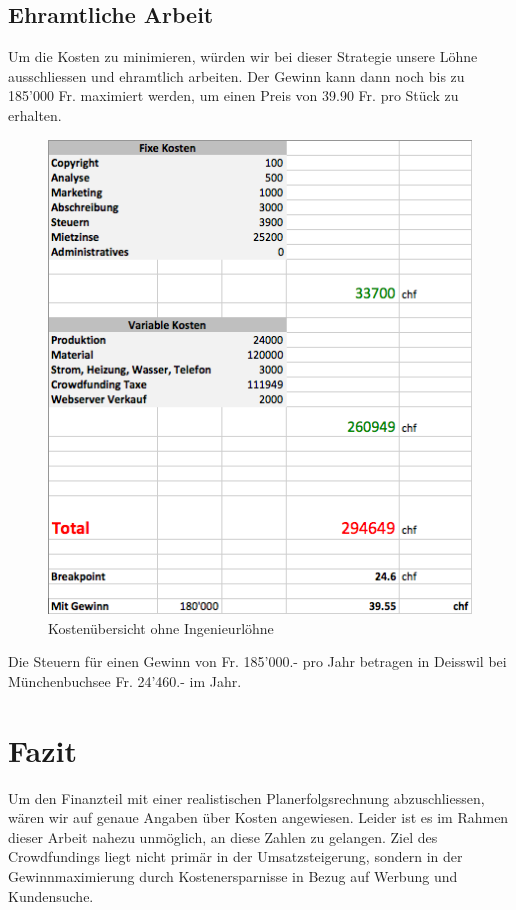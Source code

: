 \subsection{Ehramtliche Arbeit}
Um die Kosten zu minimieren, w\"urden wir bei dieser Strategie unsere L\"ohne ausschliessen und ehramtlich arbeiten.
Der Gewinn kann dann noch bis zu 185'000 Fr. maximiert werden, um einen Preis von 39.90 Fr. pro St\"uck zu erhalten.
\begin{figure}[H]
	\centering
		\includegraphics[scale=0.6]{bilder/ehramtlich.png}
	\caption{Kosten\"ubersicht ohne Ingenieurl\"ohne}
	\label{fig:ehramtlich}
\end{figure}
Die Steuern f\"ur einen Gewinn von Fr. 185'000.- pro Jahr betragen in Deisswil bei M\"unchenbuchsee Fr. 24'460.- im Jahr.


\section{Fazit}
Um den Finanzteil mit einer realistischen Planerfolgsrechnung abzuschliessen, w\"aren wir auf genaue Angaben \"uber Kosten angewiesen. Leider ist es im Rahmen dieser Arbeit nahezu unm\"oglich, an diese Zahlen zu gelangen. Ziel des Crowdfundings liegt nicht prim\"ar in der Umsatzsteigerung, sondern in der Gewinnmaximierung durch Kostenersparnisse in Bezug auf Werbung und Kundensuche. 